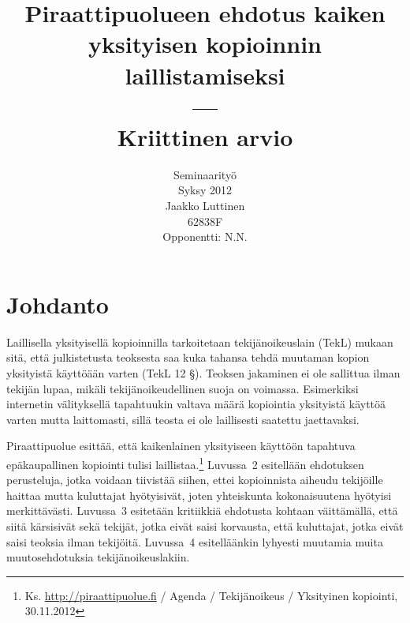 \documentclass[titlepage,12pt]{article}
\title{Piraattipuolueen ehdotus kaiken yksityisen kopioinnin
  laillistamiseksi\\ --- \\ Kriittinen arvio}
\author{
  Seminaarityö\\
  \hfill Syksy 2012\\
  Jaakko Luttinen\\
  $62838$F\\
  Opponentti: N.N.
}
\date{ }
\begin{document}
\renewcommand\refname{Lähteet}
\renewcommand\bibname{Lähteet}

\nocite{*}

\maketitle

\tableofcontents



\pagebreak


\section{Johdanto}


Laillisella yksityisellä kopioinnilla tarkoitetaan tekijänoikeuslain
(TekL) mukaan sitä, että julkistetusta teoksesta saa kuka tahansa
tehdä muutaman kopion yksityistä käyttöään varten (TekL 12 §). Teoksen
jakaminen ei ole sallittua ilman tekijän lupaa, mikäli
tekijänoikeudellinen suoja on voimassa.  Esimerkiksi internetin
välityksellä tapahtuukin valtava määrä kopiointia yksityistä käyttöä
varten mutta laittomasti, sillä teosta ei ole laillisesti saatettu
jaettavaksi.




Piraattipuolue esittää, että kaikenlainen yksityiseen käyttöön
tapahtuva epäkaupallinen kopiointi tulisi
laillistaa.\footnote{Ks. \url{http://piraattipuolue.fi} / Agenda /
  Tekijänoikeus / Yksityinen kopiointi, 30.11.2012} Luvussa~2
esitellään ehdotuksen perusteluja, jotka voidaan tiivistää siihen,
ettei kopioinnista aiheudu tekijöille haittaa mutta kuluttajat
hyötyisivät, joten yhteiskunta kokonaisuutena hyötyisi merkittävästi.
Luvussa~3 esitetään kritiikkiä ehdotusta kohtaan väittämällä, että
siitä kärsisivät sekä tekijät, jotka eivät saisi korvausta, että
kuluttajat, jotka eivät saisi teoksia ilman tekijöitä.  Luvussa~4
esitelläänkin lyhyesti muutamia muita muutosehdotuksia
tekijänoikeuslakiin.
\end{document}
